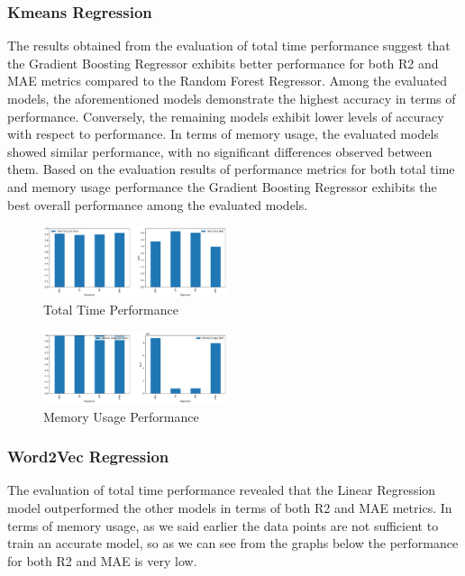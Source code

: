 \documentclass[conference]{IEEEtran}
\begin{document}
\subsubsection{Kmeans Regression}
The results obtained from the evaluation of total time performance suggest that the Gradient Boosting Regressor exhibits better performance for both R2 and MAE metrics compared to the Random Forest Regressor. Among the evaluated models, the aforementioned models demonstrate the highest accuracy in terms of performance. Conversely, the remaining models exhibit lower levels of accuracy with respect to performance. 
In terms of memory usage, the evaluated models showed similar performance, with no significant differences observed between them. Based on the evaluation results of performance metrics for both total time and memory usage performance the Gradient Boosting Regressor exhibits the best overall performance among the evaluated models.

\begin{figure}[!h]
  \centering
  \includegraphics[width=0.48\textwidth]{plots/model_performance_results/kmeans_total_time_results.pdf}
  \caption{Total Time Performance}
\end{figure}

\begin{figure}[ht]
  \centering
  \includegraphics[width=0.48\textwidth]{plots/model_performance_results/kmeans_memory_results.pdf}
  \caption{Memory Usage Performance}
\end{figure}

\subsubsection{Word2Vec Regression}
The evaluation of total time performance revealed that the Linear Regression model outperformed the other models in terms of both R2 and MAE metrics. In terms of memory usage, as we said earlier the data points are not sufficient to train an accurate model, so as we can see from the graphs below the performance for both R2 and MAE is very low. 
\end{document}
